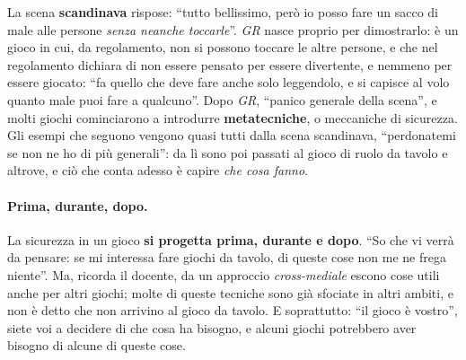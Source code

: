 La scena \textbf{scandinava} rispose: ``tutto bellissimo, però io posso fare un sacco
di male alle persone \emph{senza neanche toccarle}''. \emph{GR} nasce proprio per
dimostrarlo: è un gioco in cui, da regolamento, non si possono toccare le altre
persone, e che nel regolamento dichiara di non essere pensato per essere divertente,
e nemmeno per essere giocato: ``fa quello che deve fare anche solo leggendolo, e si
capisce al volo quanto male puoi fare a qualcuno''. Dopo \emph{GR}, ``panico generale
della scena'', e molti giochi cominciarono a introdurre \textbf{metatecniche}, o
meccaniche di sicurezza. Gli esempi che seguono vengono quasi tutti dalla scena
scandinava, ``perdonatemi se non ne ho di più generali'': da lì sono poi passati al
gioco di ruolo da tavolo e altrove, e ciò che conta adesso è capire \emph{che cosa
fanno}.

\paragraph{Prima, durante, dopo.} La sicurezza in un gioco \textbf{si progetta prima,
durante e dopo}. ``So che vi verrà da pensare: se mi interessa fare giochi da tavolo,
di queste cose non me ne frega niente''. Ma, ricorda il docente, da un approccio
\emph{cross-mediale} escono cose utili anche per altri giochi; molte di queste
tecniche sono già sfociate in altri ambiti, e non è detto che non arrivino al gioco da
tavolo. E soprattutto: ``il gioco è vostro'', siete voi a decidere di che cosa ha
bisogno, e alcuni giochi potrebbero aver bisogno di alcune di queste cose.

